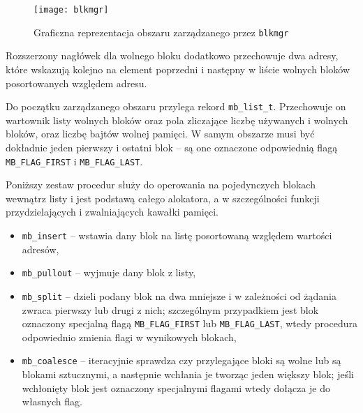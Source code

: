 \documentclass[12pt,a4paper,titlepage,twoside]{mwart}
\begin{document}
\begin{figure}[ht]
\centering
\texttt{[image: blkmgr]}
\caption{Graficzna reprezentacja obszaru zarządzanego przez \texttt{blkmgr}}
\end{figure}

Rozszerzony nagłówek dla wolnego bloku dodatkowo przechowuje dwa adresy, które
wskazują kolejno na element poprzedni i następny w liście wolnych bloków
posortowanych względem adresu.

Do początku zarządzanego obszaru przylega rekord \verb+mb_list_t+. Przechowuje
on wartownik listy wolnych bloków oraz pola zliczające liczbę używanych i
wolnych bloków, oraz liczbę bajtów wolnej pamięci. W samym obszarze musi być
dokładnie jeden pierwszy i ostatni blok -- są one oznaczone odpowiednią flagą
\verb+MB_FLAG_FIRST+ i \verb+MB_FLAG_LAST+.

Poniższy zestaw procedur służy do operowania na pojedynczych blokach wewnątrz
listy i jest podstawą całego alokatora, a w szczególności funkcji
przydzielających i zwalniających kawałki pamięci.
\begin{itemize}
\item \verb+mb_insert+ -- wstawia dany blok na listę posortowaną względem
wartości adresów,
\item \verb+mb_pullout+ -- wyjmuje dany blok z listy,
\item \verb+mb_split+ -- dzieli podany blok na dwa mniejsze i w zależności od
żądania zwraca pierwszy lub drugi z nich; szczególnym przypadkiem jest blok
oznaczony specjalną flagą \verb+MB_FLAG_FIRST+ lub \verb+MB_FLAG_LAST+, wtedy
procedura odpowiednio zmienia flagi w wynikowych blokach,
\item \verb+mb_coalesce+ -- iteracyjnie sprawdza czy przylegające bloki są
wolne lub są blokami sztucznymi, a następnie wchłania je tworząc jeden większy
blok; jeśli wchłonięty blok jest oznaczony specjalnymi flagami wtedy dołącza je
do własnych flag.
\end{itemize}
\end{document}
